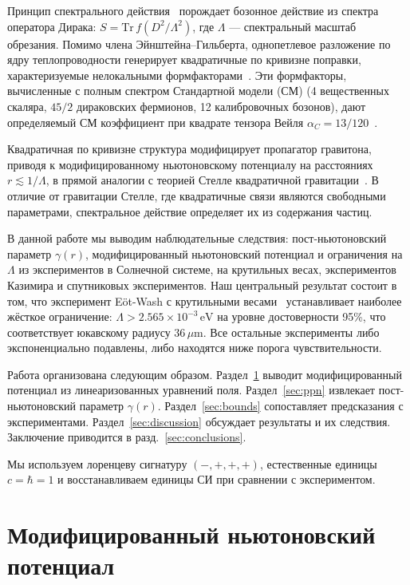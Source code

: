 \documentclass[aps,prd,twocolumn,superscriptaddress,nofootinbib,floatfix]{revtex4-2}
\begin{document}
Принцип спектрального действия~\cite{Chamseddine:1996zu,Chamseddine:2006ep}
порождает бозонное действие из спектра оператора Дирака:
$S = \mathrm{Tr}\,f(D^2/\Lambda^2)$, где $\Lambda$ --- спектральный
масштаб обрезания. Помимо члена Эйнштейна--Гильберта, однопетлевое
разложение по ядру теплопроводности генерирует квадратичные по
кривизне поправки, характеризуемые нелокальными
формфакторами~\cite{Barvinsky:1985an,Codello:2012kq}. Эти формфакторы,
вычисленные с полным спектром Стандартной модели (СМ)
(4 вещественных скаляра, $45/2$ дираковских фермионов, 12 калибровочных
бозонов), дают определяемый СМ коэффициент при квадрате тензора Вейля
$\alpha_C = 13/120$~\cite{Alfyorov:2026ff}.

Квадратичная по кривизне структура модифицирует пропагатор гравитона,
приводя к модифицированному ньютоновскому потенциалу на расстояниях
$r \lesssim 1/\Lambda$, в прямой аналогии с теорией Стелле
квадратичной гравитации~\cite{Stelle:1976gc,Stelle:1978}. В отличие
от гравитации Стелле, где квадратичные связи являются свободными
параметрами, спектральное действие определяет их из содержания
частиц.

В данной работе мы выводим наблюдательные следствия:
пост-ньютоновский параметр $\gamma(r)$, модифицированный ньютоновский
потенциал и ограничения на $\Lambda$ из экспериментов в Солнечной
системе, на крутильных весах, экспериментов Казимира и спутниковых
экспериментов. Наш центральный результат состоит в том, что
эксперимент E\"ot-Wash с крутильными весами~\cite{Lee:2020}
устанавливает наиболее жёсткое ограничение:
$\Lambda > 2.565 \times 10^{-3}\,\mathrm{eV}$ на уровне
достоверности 95\%, что соответствует юкавскому радиусу
$36\,\mu\mathrm{m}$. Все остальные эксперименты либо экспоненциально
подавлены, либо находятся ниже порога чувствительности.

Работа организована следующим образом. Раздел~\ref{sec:potential}
выводит модифицированный потенциал из линеаризованных уравнений поля.
Раздел~\ref{sec:ppn} извлекает пост-ньютоновский параметр $\gamma(r)$.
Раздел~\ref{sec:bounds} сопоставляет предсказания с экспериментами.
Раздел~\ref{sec:discussion} обсуждает результаты и их следствия.
Заключение приводится в разд.~\ref{sec:conclusions}.

Мы используем лоренцеву сигнатуру $(-,+,+,+)$, естественные единицы
$c = \hbar = 1$ и восстанавливаем единицы СИ при сравнении с
экспериментом.


\section{Модифицированный ньютоновский потенциал}
\label{sec:potential}
\end{document}

